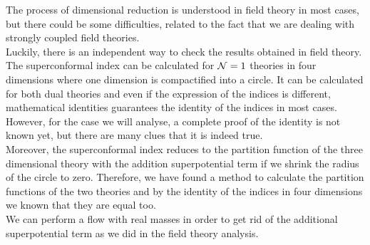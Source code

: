 The process of dimensional reduction is understood in field theory in most cases, but there could be some difficulties, related to the fact that we are dealing with strongly coupled field theories.\\
Luckily, there is an independent way to check the results obtained in  field theory.\\
The superconformal index can be calculated for $\mathcal{N}=1$ theories in four dimensions where one dimension is compactified into a circle. 
It can be calculated for both dual theories and even if the expression of the indices is different, mathematical identities guarantees the identity of the indices in most cases.  
However, for the case we will analyse, a complete proof of the identity is not  known yet, but there are many clues that it is indeed true.\\
Moreover, the superconformal index reduces to the partition function of the three dimensional theory with the addition superpotential term if we shrink the radius of the circle to zero.  
Therefore, we have found a method to calculate the partition functions of the two theories and by the identity of the indices in four dimensions we known that they are equal too.\\
We can perform a flow with real masses in order to get rid of the additional superpotential term as we did in the field theory analysis.\\

